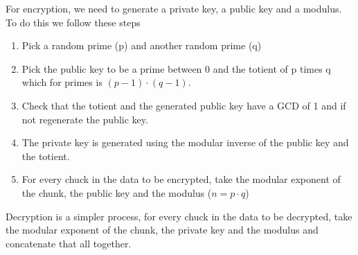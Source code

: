 \documentclass[journal,a4paper]{article}
\begin{document}
For encryption, we need to generate a private key, a public key and a modulus. To do this we follow these steps
\begin{enumerate}
	\itemsep0em
	\item Pick a random prime (p) and another random prime (q)
	\item Pick the public key to be a prime between 0 and the totient of p times q which for primes is $(p-1)\cdot (q-1)$.
	\item Check that the totient and the generated public key have a GCD of 1 and if not regenerate the public key.
	\item The private key is generated using the modular inverse of the public key and the totient.
	\item For every chuck in the data to be encrypted, take the modular exponent of the chunk, the public key and the modulus ($n = p\cdot q$)
\end{enumerate}

Decryption is a simpler process, for every chuck in the data to be decrypted, take the modular exponent of the chunk, the private key and the modulus and concatenate that all together.
\end{document}
